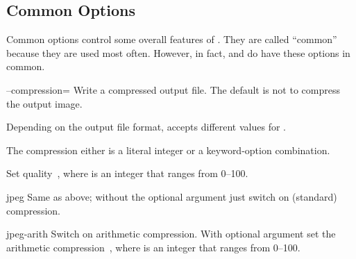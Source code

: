 

\subsection[Common Options\commonpart]{Common Options\commonpart
  \label{sec:common-options}
  }

Common options control some overall features of \App.  They are called
``common'' because they are used most often.  However, in fact, \App{}
and \OtherApp{} do have these options in common.

\begin{codelist}
  \label{opt:compression}%
\item[--compression=\metavar{COMPRESSION}]\itemend Write a compressed
  output file.  The default is not to compress the output image.

  Depending on the output file format, \App{} accepts different values
  for .

  \begin{description}
  \item[\acronym{JPEG} format.]\itemend The compression either is a
    literal integer or a keyword\hyp{}option combination.

    \begin{codelist}
    \item[\metavar{LEVEL}]\itemend Set 
      quality~, where  is an integer
      that ranges from 0--100.

    \item[jpeg\optional{:\metavar{LEVEL}}]\itemend Same as above;
      without the optional argument just switch on (standard)
       compression.

    \item[jpeg-arith\optional{:\metavar{LEVEL}}]\itemend Switch on
      arithmetic  compression.  With optional argument
      set the arithmetic compression~, where
       is an integer that ranges from 0--100.
    \end{codelist}


\end{description}
\end{codelist}
